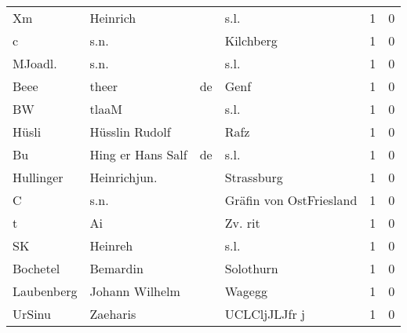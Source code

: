 \begin{center}
\begin{tiny}
\begin{longtabu}{llllrr}
                       Xm &                           Heinrich &             &                                        s.l. &          1 &         0 \\
                        c &                               s.n. &             &                                   Kilchberg &          1 &         0 \\
                  MJoadl. &                               s.n. &             &                                        s.l. &          1 &         0 \\
                     Beee &                              theer &          de &                                        Genf &          1 &         0 \\
                       BW &                              tlaaM &             &                                        s.l. &          1 &         0 \\
                    Hüsli &                     Hüsslin Rudolf &             &                                        Rafz &          1 &         0 \\
                       Bu &                  Hing er Hans Salf &          de &                                        s.l. &          1 &         0 \\
                Hullinger &                       Heinrichjun. &             &                                  Strassburg &          1 &         0 \\
                        C &                               s.n. &             &                     Gräfin von OstFriesland &          1 &         0 \\
                        t &                                 Ai &             &                                     Zv. rit &          1 &         0 \\
                       SK &                            Heinreh &             &                                        s.l. &          1 &         0 \\
                 Bochetel &                           Bemardin &             &                                   Solothurn &          1 &         0 \\
               Laubenberg &                     Johann Wilhelm &             &                                      Wagegg &          1 &         0 \\
                   UrSinu &                           Zaeharis &             &                               UCLCljJLJfr j &          1 &         0 \\

\end{longtabu}
\end{tiny}
\end{center}
